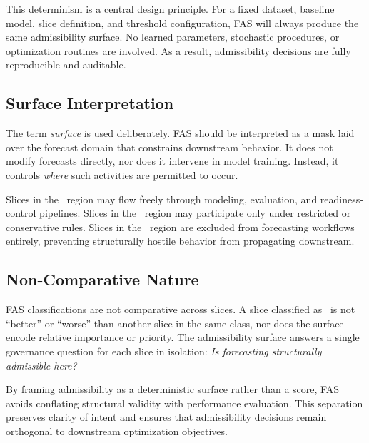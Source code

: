 This determinism is a central design principle. For a fixed dataset, baseline
model, slice definition, and threshold configuration, FAS will always produce
the same admissibility surface. No learned parameters, stochastic procedures, or
optimization routines are involved. As a result, admissibility decisions are
fully reproducible and auditable.

\subsection{Surface Interpretation}

The term \emph{surface} is used deliberately. FAS should be interpreted as a mask
laid over the forecast domain that constrains downstream behavior. It does not
modify forecasts directly, nor does it intervene in model training. Instead, it
controls \emph{where} such activities are permitted to occur.

Slices in the \Allowed\ region may flow freely through modeling, evaluation, and
readiness-control pipelines. Slices in the \Conditional\ region may participate
only under restricted or conservative rules. Slices in the \Blocked\ region are
excluded from forecasting workflows entirely, preventing structurally hostile
behavior from propagating downstream.

\subsection{Non-Comparative Nature}

FAS classifications are not comparative across slices. A slice classified as
\Conditional\ is not “better” or “worse” than another slice in the same class,
nor does the surface encode relative importance or priority. The admissibility
surface answers a single governance question for each slice in isolation:
\emph{Is forecasting structurally admissible here?}

By framing admissibility as a deterministic surface rather than a score, FAS
avoids conflating structural validity with performance evaluation. This
separation preserves clarity of intent and ensures that admissibility decisions
remain orthogonal to downstream optimization objectives.
